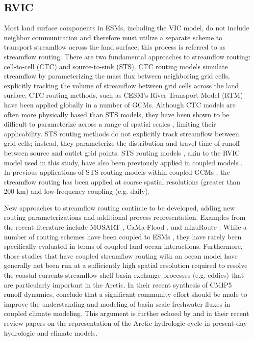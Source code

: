 \documentclass[jgrga, draft]{agutex}
\begin{document}
\begin{article}
\subsection{RVIC}
\label{sec:rvic}

Most land surface components in ESMs, including the VIC model, do not include neighbor communication and therefore must utilize a separate scheme to transport streamflow across the land surface; this process is referred to as streamflow routing.
There are two fundamental approaches to streamflow routing: cell-to-cell (CTC) and source-to-sink (STS).
CTC routing models simulate streamflow by parameterizing the mass flux between neighboring grid cells, explicitly tracking the volume of streamflow between grid cells across the land surface.
CTC routing methods, such as CESM's River Transport Model (RTM) \citep{Branstetter_2003} have been applied globally in a number of GCMs.
Although CTC models are often more physically based than STS models, they have been shown to be difficult to parameterize across a range of spatial scales \citep{Sushama_2004}, limiting their applicability.
STS routing methods do not explicitly track streamflow between grid cells; instead, they parameterize the distribution and travel time of runoff between source and outlet grid points.
STS routing models \citep[e.g.][]{Lohmann_1996,Naden_1992}, akin to the RVIC model used in this study, have also been previously applied in coupled models \citep[e.g.][]{Olivera_2000}.
In previous applications of STS routing models within coupled GCMs \citep[e.g.][]{Olivera_2000}, the streamflow routing has been applied at coarse spatial resolutions (greater than 200 km) and low-frequency coupling (e.g. daily).

New approaches to streamflow routing continue to be developed, adding new routing parameterizations and additional process representation.
Examples from the recent literature include MOSART \citep{Li_2013}, CaMa-Flood \citep{Yamazaki_2009,Yamazaki_2014}, and mizuRoute \citep{Clark_2016}.
While a number of routing schemes have been coupled to ESMs \citep[e.g.][]{Sushama_2004,Olivera_2000,Li_2013}, they have rarely been specifically evaluated in terms of coupled land-ocean interactions.
Furthermore, those studies that have coupled streamflow routing with an ocean model have generally not been run at a sufficiently high spatial resolution required to resolve the coastal currents streamflow-shelf-basin exchange processes (e.g. eddies) that are particularly important in the Arctic.
In their recent synthesis of CMIP5 runoff dynamics, \citet{Bring_2015} conclude that a significant community effort should be made to improve the understanding and modeling of basin scale freshwater fluxes in coupled climate modeling.
This argument is further echoed by \citet{Lique_2015} and \citet{Bring_2016} in their recent review papers on the representation of the Arctic hydrologic cycle in present-day hydrologic and climate models.


\end{article}
\end{document}
